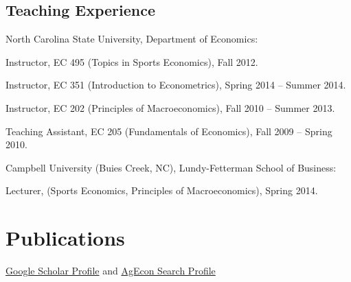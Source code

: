 \documentclass[letterpaper]{article}
\renewenvironment{itemize}{
  \begin{list}{}{
    \setlength{\leftmargin}{1.5em}
  }
}{
  \end{list}
}
\begin{document}
\subsection*{Teaching Experience}
\begin{itemize}
\item North Carolina State University, Department of Economics:
\begin{itemize}
\item Instructor, EC 495 (Topics in Sports Economics), Fall 2012.
\item Instructor, EC 351 (Introduction to Econometrics), Spring 2014 -- Summer 2014.
\item Instructor, EC 202 (Principles of Macroeconomics), Fall 2010 -- Summer 2013.
\item Teaching Assistant, EC 205 (Fundamentals of Economics), Fall 2009 -- Spring 2010.
\end{itemize}

\item Campbell University (Buies Creek, NC), Lundy-Fetterman School of Business:
\begin{itemize}
\item Lecturer, (Sports Economics, Principles of Macroeconomics), Spring 2014.
\end{itemize}
\end{itemize}

\section*{Publications}

\begin{itemize}
\item \href{https://scholar.google.com/citations?user=4e7if58AAAAJ&hl=en}{Google Scholar Profile} and \href{https://ageconsearch.umn.edu/search?ln=en&p=dinterman&f=&sf=&so=d&rg=10}{AgEcon Search Profile}
\end{itemize}
\end{document}

